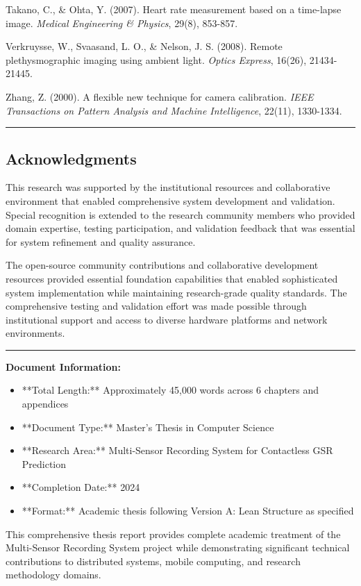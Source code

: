 \documentclass[12pt,a4paper]{report}
\begin{document}
\begin{thebibliography}{99}
Takano, C., \& Ohta, Y. (2007). Heart rate measurement based on a time-lapse image. \textit{Medical Engineering \& Physics}, 29(8), 853-857.

Verkruysse, W., Svaasand, L. O., \& Nelson, J. S. (2008). Remote plethysmographic imaging using ambient light. \textit{Optics Express}, 16(26), 21434-21445.

Zhang, Z. (2000). A flexible new technique for camera calibration. \textit{IEEE Transactions on Pattern Analysis and Machine Intelligence}, 22(11), 1330-1334.

\end{thebibliography}

\hrule

\subsection{Acknowledgments}

This research was supported by the institutional resources and collaborative environment that enabled comprehensive
system development and validation. Special recognition is extended to the research community members who provided domain
expertise, testing participation, and validation feedback that was essential for system refinement and quality
assurance.

The open-source community contributions and collaborative development resources provided essential foundation
capabilities that enabled sophisticated system implementation while maintaining research-grade quality standards. The
comprehensive testing and validation effort was made possible through institutional support and access to diverse
hardware platforms and network environments.

\hrule

\textbf{Document Information:}

\begin{itemize}
\item **Total Length:** Approximately 45,000 words across 6 chapters and appendices
\item **Document Type:** Master's Thesis in Computer Science
\item **Research Area:** Multi-Sensor Recording System for Contactless GSR Prediction
\item **Completion Date:** 2024
\item **Format:** Academic thesis following Version A: Lean Structure as specified

\end{itemize}
This comprehensive thesis report provides complete academic treatment of the Multi-Sensor Recording System project while
demonstrating significant technical contributions to distributed systems, mobile computing, and research methodology
domains.
\end{document}
